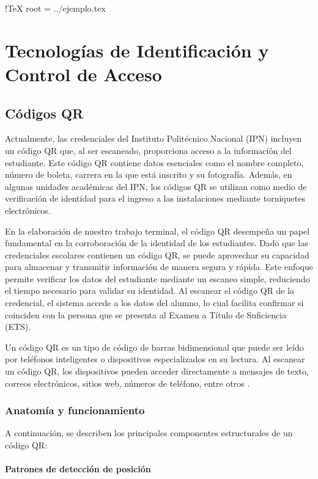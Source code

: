 !TeX root = ../ejemplo.tex
\section{Tecnologías de Identificación y Control de Acceso}
\subsection{Códigos QR}

Actualmente, las credenciales del Instituto Politécnico Nacional (IPN) incluyen un código QR que, al ser escaneado, proporciona acceso a la información del estudiante. Este código QR contiene datos esenciales como el nombre completo, número de boleta, carrera en la que está inscrito y su fotografía. Además, en algunas unidades académicas del IPN, los códigos QR se utilizan como medio de verificación de identidad para el ingreso a las instalaciones mediante torniquetes electrónicos.

En la elaboración de nuestro trabajo terminal, el código QR desempeña un papel fundamental en la corroboración de la identidad de los estudiantes. Dado que las credenciales escolares contienen un código QR, se puede aprovechar su capacidad para almacenar y transmitir información de manera segura y rápida. Este enfoque permite verificar los datos del estudiante mediante un escaneo simple, reduciendo el tiempo necesario para validar su identidad. Al escanear el código QR de la credencial, el sistema accede a los datos del alumno, lo cual facilita confirmar si coinciden con la persona que se presenta al Examen a Título de Suficiencia (ETS).

Un código QR es un tipo de código de barras bidimensional que puede ser leído por teléfonos inteligentes o dispositivos especializados en su lectura. Al escanear un código QR, los dispositivos pueden acceder directamente a mensajes de texto, correos electrónicos, sitios web, números de teléfono, entre otros \cite{CitaA01}.

\subsubsection{Anatomía y funcionamiento}

A continuación, se describen los principales componentes estructurales de un código QR:

\paragraph{Patrones de detección de posición}

